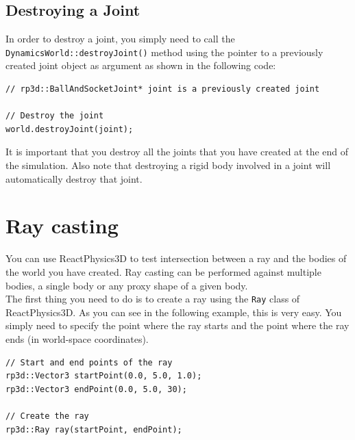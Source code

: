 \documentclass[a4paper,12pt]{article}
\begin{document}
    \subsection{Destroying a Joint}

    \begin{sloppypar}
    In order to destroy a joint, you simply need to call the \texttt{DynamicsWorld::destroyJoint()} method using the pointer to
    a previously created joint object as argument as shown in the following code: \\
   \end{sloppypar}

    \begin{lstlisting}
// rp3d::BallAndSocketJoint* joint is a previously created joint

// Destroy the joint
world.destroyJoint(joint);
  \end{lstlisting}

    \vspace{0.6cm}

    It is important that you destroy all the joints that you have created at the end of the simulation. Also note that destroying a
    rigid body involved in a joint will automatically destroy that joint.

    \section{Ray casting}
    \label{sec:raycasting}

    You can use ReactPhysics3D to test intersection between a ray and the bodies of the world you have created. Ray casting can be performed against multiple bodies, a single body or
    any proxy shape of a given body. \\

    The first thing you need to do is to create a ray using the \texttt{Ray} class of ReactPhysics3D. As you can see in the following example, this is very easy. You
    simply need to specify the point where the ray starts and the point where the ray ends (in world-space coordinates). \\

    \begin{lstlisting}
// Start and end points of the ray
rp3d::Vector3 startPoint(0.0, 5.0, 1.0);
rp3d::Vector3 endPoint(0.0, 5.0, 30);

// Create the ray
rp3d::Ray ray(startPoint, endPoint);
  \end{lstlisting}
\end{document}
